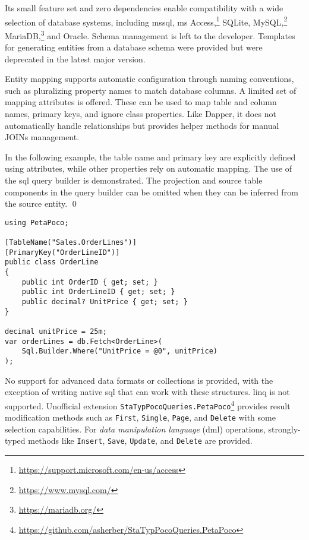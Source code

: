 Its small feature set and zero dependencies enable compatibility with a wide selection of database systems, including \acrshort{mssql}, \acrshort{ms} Access,\footnote{\url{https://support.microsoft.com/en-us/access}} SQLite, MySQL,\footnote{\url{https://www.mysql.com/}} MariaDB,\footnote{\url{https://mariadb.org/}} and Oracle. Schema management is left to the developer. Templates for generating entities from a database schema were provided but were deprecated in the latest major version.

Entity mapping supports automatic configuration through naming conventions, such as pluralizing property names to match database columns. A limited set of mapping attributes is offered. These can be used to map table and column names, primary keys, and ignore class properties. Like Dapper, it does not automatically handle relationships but provides helper methods for manual JOINs management.

\begin{example}
\small
In the following example, the table name and primary key are explicitly defined using attributes, while other properties rely on automatic mapping. The use of the \acrshort{sql} query builder is demonstrated. The projection and source table components in the query builder can be omitted when they can be inferred from the source entity.
\qed

\begin{lstlisting}[language=CSharp]
using PetaPoco;

[TableName("Sales.OrderLines")]
[PrimaryKey("OrderLineID")]
public class OrderLine
{
    public int OrderID { get; set; }
    public int OrderLineID { get; set; }
    public decimal? UnitPrice { get; set; }
}

decimal unitPrice = 25m;
var orderLines = db.Fetch<OrderLine>(
    Sql.Builder.Where("UnitPrice = @0", unitPrice)
);
\end{lstlisting}
\end{example}

No support for advanced data formats or collections is provided, with the exception of writing native \acrshort{sql} that can work with these structures. \acrshort{linq} is not supported. Unofficial extension \texttt{StaTypPocoQueries.PetaPoco}\footnote{\url{https://github.com/asherber/StaTypPocoQueries.PetaPoco}} provides result modification methods such as \texttt{First}, \texttt{Single}, \texttt{Page}, and \texttt{Delete} with some selection capabilities. For \textit{data manipulation language} (\acrshort{dml}) operations, strongly-typed methods like \texttt{Insert}, \texttt{Save}, \texttt{Update}, and \texttt{Delete} are provided. 

